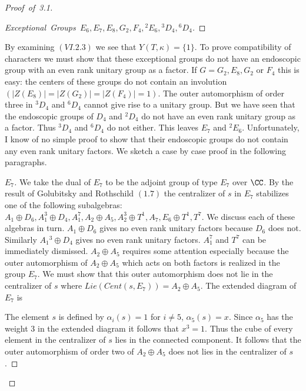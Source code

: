 \documentclass{memo-l}
\theoremstyle{definition}
\theoremstyle{remark}
\numberwithin{section}{chapter}
\numberwithin{equation}{chapter}
\begin{document}
\begin{proof}[Proof\ of\ 3.1]
\begin{proof}[Exceptional\ Groups\
$E_{6},E_{7},E_{8},G_{2},F_{4},{}^{2}E_{6},{}^{3}D_{4},{}^{6}D_{4}$]
\phantom\qedhere
\end{proof}


By examining $(VI.2.3)$ we see that $Y(T,{\kappa})  =  \{1\}$.  To prove
compatibility of characters we must show that these exceptional groups do
not have an endoscopic group with an even rank unitary group as a factor.
If $G  =  G_{2},E_{8},G_{2}$ or $F_{4}$ this is easy: the centers of these
groups do not contain an involution $(\vert Z(E_{8})\vert  =  \vert
Z(G_{2})\vert  =  \vert Z(F_{4})\vert  =  1)$.  The outer automorphism of order
three in ${}^{3}D_{4}$ and ${}^{6}D_{4}$ cannot give rise to a unitary group.
But we have seen that the endoscopic groups of $D_{4}$ and ${}^{2}D_{4}$ do
not have an even rank unitary group as a factor.  Thus ${}^{3}D_{4}$ and
${}^{6}D_{4}$ do not either.  This leaves $E_{7}$ and ${}^{2}E_{6}$.
Unfortunately, I know of no simple proof to show that their endoscopic
groups do not contain any even rank unitary factors.  We sketch a case by
case proof in the following paragraphs.

\begin{proof}[$E_{7}$] We take the dual of $E_{7}$ to be the adjoint group of type
$E_{7}$ over ${\CC}$.  By the result of Golubitsky and Rothschild
$(1.7)$ the centralizer of $s$ in $E_{7}$ stabilizes one of the following
subalgebras: $A_{1}\oplus D_{6}, A_{1}^{3}\oplus D_{4}, A_{1}^{7}, A_{2}\oplus A_{5},
A_{2}^{3}\oplus T^{1}, A_{7}, E_{6}\oplus T^{1}, T^{7}$.  We discuss each of these
algebras in turn.  $A_{1}\oplus D_{6}$ gives no even rank unitary factors
because $D_{6}$ does not.  Similarly $A_{1}{}^{3}\oplus D_{4}$ gives no even rank
unitary factors.  $A_{1}^{7}$ and $T^{7}$ can be immediately dismissed.
$A_{2}\oplus A_{5}$ requires some attention especially because the outer
automorphism of $A_{2}\oplus A_{5}$ which acts on both factors is realized in
the group $E_{7}$.  We must show that this outer automorphism does not lie
in the centralizer of $s$ where $Lie(Cent(s,E_{7}))  =  A_{2}\oplus A_{5}$.  The
extended diagram of $E_{7}$ is


\medskip

The element $s$ is defined by ${\alpha}_{i}(s) = 1$ for $i \ne 5$,
${\alpha}_{5}(s) = x$.  Since ${\alpha}_{5}$ has the weight $3$ in the
extended diagram it follows that $x^{3} = 1$.  Thus the cube of every element
in the centralizer of $s$ lies in the connected component.  It follows that
the outer automorphism of order two of $A_{2}\oplus A_{5}$ does not lies in the
centralizer of $s$.



\end{proof}
\end{proof}
\end{document}
